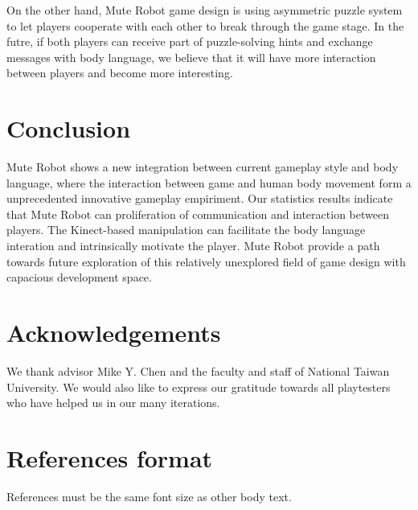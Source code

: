 \documentclass{chi-ext}
\begin{document}
On the other hand, Mute Robot game design is using asymmetric puzzle system to let players cooperate with each other to break through the game stage. In the futre, if both players can receive part of puzzle-solving hints and exchange messages with body language, we believe that it will have more interaction between players and become more interesting.


\section{Conclusion}
Mute Robot shows a new integration between current gameplay style and body language, where the interaction between game and human body movement form a unprecedented innovative gameplay empiriment.
Our statistics results indicate that Mute Robot can proliferation of communication and interaction between players.
The Kinect-based manipulation can facilitate the body language interation and intrinsically motivate the player.
Mute Robot provide a path towards future exploration of this relatively unexplored field of game design with capacious development space.



\section{Acknowledgements}
We thank advisor Mike Y. Chen and the faculty and staff of National Taiwan University.
We would also like to express our gratitude towards all playtesters who have helped us in our many iterations. 


\section{References format}
References must be the same font size as other body text.

\balance


\end{document}
